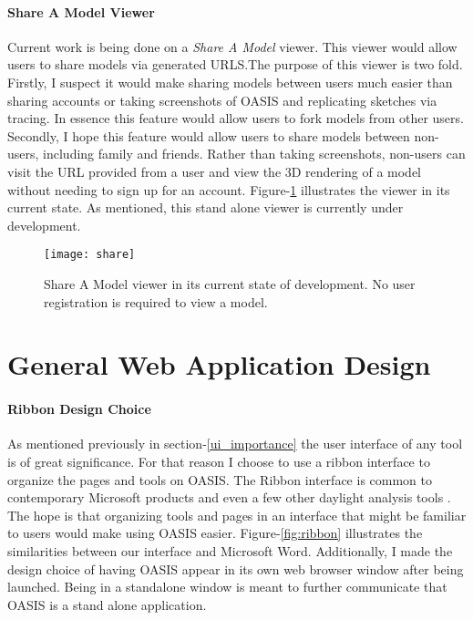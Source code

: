 \paragraph{Share A Model Viewer}
Current work is being done on a \textit{Share A Model} viewer. This viewer would allow users to share models via generated URLS.The purpose of this viewer is two fold. Firstly, I suspect it would make sharing models between users much easier than sharing accounts or taking screenshots of OASIS and replicating sketches via tracing. In essence this feature would allow users to fork models from other users. Secondly, I hope this feature would allow users to share models between non-users, including family and friends. Rather than taking screenshots, non-users can visit the URL provided from a user and view the 3D rendering of a model without needing to sign up for an account. Figure-\ref{fig:share} illustrates the viewer in its current state. As mentioned, this stand alone viewer is currently under development.\\

\begin{figure}[!ht]
\centering
\texttt{[image: share]}
\caption[Share A Model viewer in its current state of development.]{Share A Model viewer in its current state of development. No user registration is required to view a model.}
\label{fig:share}
\end{figure}

\section{General Web Application Design}

\paragraph{Ribbon Design Choice} 
As mentioned previously in section-\ref{ui_importance} the user interface of any tool is of great significance.  For that reason I choose to use a ribbon interface to organize the pages and tools on OASIS.  The Ribbon interface is common to contemporary Microsoft products and even a few other daylight analysis tools \cite{Dostal}.  The hope is that organizing tools and pages in an interface that might be familiar to users would make using OASIS easier. Figure-\ref{fig:ribbon} illustrates the similarities between our interface and Microsoft Word.  Additionally, I made the design choice of having OASIS appear in its own web browser window after being launched. Being in a standalone window is meant to further communicate that OASIS is a stand alone application.\\


